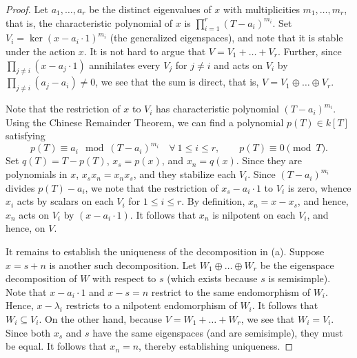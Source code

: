 \begin{proof}
    Let $a_1,\dots,a_r$ be the distinct eigenvalues of $x$ with multiplicities $m_1,\dots,m_r$, that is, the characteristic polynomial of $x$ is $\prod\limits_{i = 1}^r (T - a_i)^{m_i}$. Set $V_i = \ker(x - a_i\cdot 1)^{m_i}$ (the generalized eigenspaces), and note that it is stable under the action $x$. It is not hard to argue that $V = V_1 + \dots + V_r$. Further, since $\prod\limits_{j\ne i} (x - a_j\cdot 1)$ annihilates every $V_j$ for $j\ne i$ and acts on $V_i$ by $\prod\limits_{j\ne i} (a_j - a_i)\ne 0$, we see that the sum is direct, that is, $V = V_1\oplus\dots\oplus V_r$.

    Note that the restriction of $x$ to $V_i$ has characteristic polynomial $(T - a_i)^{m_i}$. Using the Chinese Remainder Theorem, we can find a polynomial $p(T)\in k[T]$ satisfying 
    \begin{equation*}
        p(T)\equiv a_i\mod (T - a_i)^{m_i}\quad\forall~1\le i\le r,\qquad p(T)\equiv 0\pmod T.
    \end{equation*}
    Set $q(T) = T - p(T)$, $x_s = p(x)$, and $x_n = q(x)$. Since they are polynomials in $x$, $x_sx_n = x_nx_s$, and they stabilize each $V_i$. Since $(T - a_i)^{m_i}$ divides $p(T) - a_i$, we note that the restriction of $x_s - a_i\cdot 1$ to $V_i$ is zero, whence $x_i$ acts by scalars on each $V_i$ for $1\le i\le r$. By definition, $x_n = x - x_s$, and hence, $x_n$ acts on $V_i$ by $(x - a_i\cdot 1)$. It follows that $x_n$ is nilpotent on each $V_i$, and hence, on $V$.

    It remains to establish the uniqueness of the decomposition in (a). Suppose $x = s + n$ is another such decomposition. Let $W_1\oplus\dots\oplus W_r$ be the eigenspace decomposition of $W$ with respect to $s$ (which exists because $s$ is semisimple). Note that $x - a_i\cdot 1$ and $x - s = n$ restrict to the same endomorphism of $W_i$. Hence, $x - \lambda_i$ restricts to a nilpotent endomorphism of $W_i$. It follows that $W_i\subseteq V_i$. On the other hand, because $V = W_1 + \dots + W_r$, we see that $W_i = V_i$. Since both $x_s$ and $s$ have the same eigenspaces (and are semisimple), they must be equal. It follows that $x_n = n$, thereby establishing uniqueness.
\end{proof}


